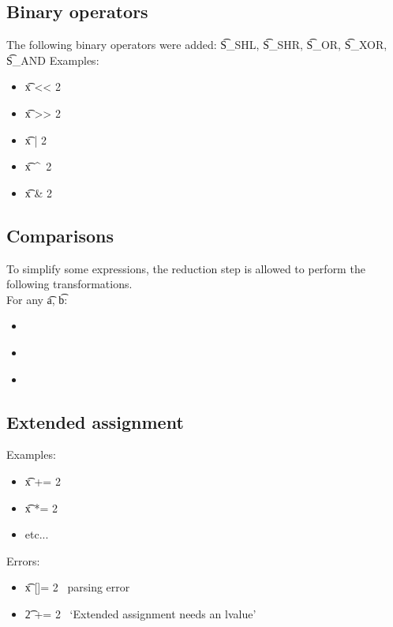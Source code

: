 \subsection{Binary operators}
The following binary operators were added:
\t{S\_SHL}, \t{S\_SHR}, \t{S\_OR}, \t{S\_XOR}, \t{S\_AND}
Examples:
\begin{itemize}
    \item \t{x << 2} \to\ 
    \item \t{x >> 2} \to\ 
    \item \t{x | 2} \to\ 
    \item \t{x \textasciicircum\ 2} \to\ 
    \item \t{x \& 2} \to\ 
\end{itemize}

\subsection{Comparisons}
To simplify some expressions, the reduction step is allowed to perform the following transformations.\\
For any \t{a}, \t{b}:
\begin{itemize}
    \item {} \to\ 
    \item {} \to\ 
    \item {} \to\ 
\end{itemize}

\subsection{Extended assignment}
Examples:
\begin{itemize}
    \item \t{x += 2} \to\ 
    \item \t{x *= 2} \to\ 
    \item etc...
\end{itemize}
Errors:
\begin{itemize}
    \item \t{x []= 2} \to\ parsing error
    \item \t{2 += 2} \to\ `Extended assignment needs an lvalue'
\end{itemize}

